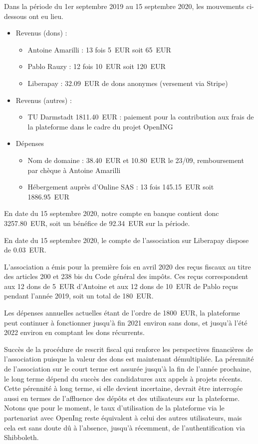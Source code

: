 \documentclass[a4paper]{article}
\begin{document}
Dans la période du 1er septembre 2019 au 15 septembre 2020, les mouvements ci-dessous ont eu lieu.
\begin{itemize}
\item Revenus (dons) :
  \begin{itemize}
    \item Antoine Amarilli : 13 fois 5~EUR soit 65~EUR
    \item Pablo Rauzy : 12 fois 10~EUR soit 120~EUR
    \item Liberapay : 32.09~EUR de dons anonymes (versement via Stripe)
  \end{itemize}
\item Revenus (autres) :
\begin{itemize}
    \item TU Darmstadt 1811.40~EUR : paiement pour la contribution aux frais de la plateforme dans le cadre du projet OpenING
\end{itemize}
\item Dépenses
  \begin{itemize}
    \item Nom de domaine : 38.40~EUR et 10.80~EUR le 23/09, remboursement par chèque à Antoine Amarilli
    \item Hébergement auprès d'Online SAS : 13 fois 145.15~EUR soit 1886.95~EUR
  \end{itemize}
\end{itemize}

En date du 15 septembre 2020, notre compte en banque contient donc 3257.80~EUR, soit un bénéfice de 92.34~EUR sur la période.

En date du 15 septembre 2020, le compte de l'association sur Liberapay dispose de 0.03~EUR.

L'association a émis pour la première fois en avril 2020 des reçus fiscaux au titre des articles 200 et 238 bis du Code général des impôts. Ces reçus correspondent aux 12 dons de 5~EUR d'Antoine et aux 12 dons de 10~EUR de Pablo reçus pendant l'année 2019, soit un total de 180~EUR.

Les dépenses annuelles actuelles étant de l'ordre de 1800~EUR, la plateforme peut continuer à fonctionner jusqu'à fin 2021 environ sans dons, et jusqu'à l'été 2022 environ en comptant les dons récurrents.


Succès de la procédure de rescrit fiscal qui renforce les perspectives financières de l'association puisque la valeur des dons est maintenant démultipliée. La pérennité de l'association sur le court terme est assurée jusqu'à la fin de l'année prochaine, le long terme dépend du succès des candidatures aux appels à projets récents. Cette pérennité à long terme, si elle devient incertaine, devrait être interrogée aussi en termes de l'affluence des dépôts et des utilisateurs sur la plateforme. 
Notons que pour le moment, le taux d'utilisation de la plateforme via le partenariat avec OpenIng reste équivalent à celui des autres utilisateurs, mais cela est sans doute dû à l'absence, jusqu'à récemment, de l'authentification via Shibboleth. 
\end{document}
